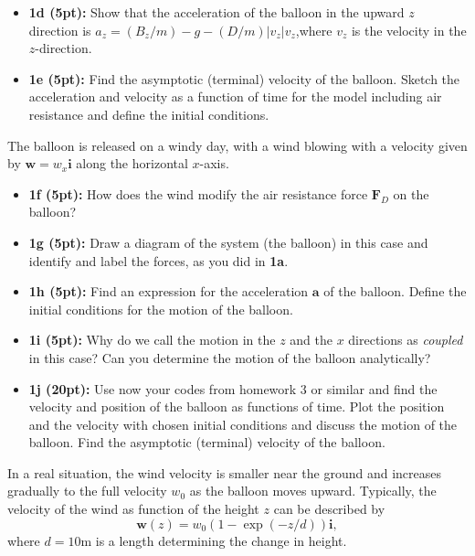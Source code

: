 \documentclass[%
oneside,                 %
final,                   %
10pt]{article}
\begin{document}
\begin{itemize}
\item \textbf{1d (5pt):} Show that the acceleration of the balloon in the upward $z$ direction is $a_z = (B_z/m)−g−(D/m)|v_z|v_z$,where $v_z$ is the velocity in the $z$-direction.

\item \textbf{1e (5pt):} Find the asymptotic (terminal) velocity of the balloon. Sketch the acceleration and velocity as a function of time for the model including air resistance and define the initial conditions.
\end{itemize}

\noindent
The balloon is released on a windy day, with a wind blowing with a velocity
given by $\bm{w} = w_x \bm{i}$ along the horizontal $x$-axis.

\begin{itemize}
\item \textbf{1f (5pt):} How does the wind modify the air resistance force $\bm{F}_D$ on the balloon?

\item \textbf{1g (5pt):} Draw a diagram of the system (the balloon) in this case and identify and label the forces, as you did in \textbf{1a}.

\item \textbf{1h (5pt):} Find an expression for the acceleration $\bm{a}$ of the balloon. Define the initial conditions for the motion of the balloon.

\item \textbf{1i (5pt):} Why do we call the motion in the $z$ and the $x$ directions as \emph{coupled} in this case? Can you determine the motion of the balloon analytically?

\item \textbf{1j (20pt):} Use now your codes from homework 3 or similar and find the velocity and position of the balloon as functions of time. Plot the position and the velocity with chosen initial conditions and discuss the motion of the balloon. Find the asymptotic (terminal) velocity of the balloon.
\end{itemize}

\noindent
In a real situation, the wind velocity is smaller near the ground and
increases gradually to the full velocity $w_0$ as the balloon moves
upward. Typically, the velocity of the wind as function of the height $z$ can be described
by
\[
\bm{w}(z) = w_0 (1−\exp{(−z/d)}) \bm{i},
\]
where $d = 10$m is a length determining the change in height.
\end{document}
